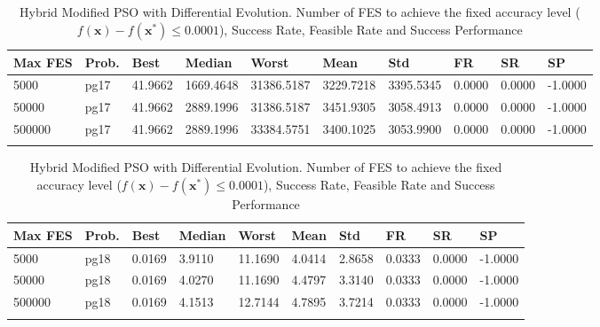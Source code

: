 \documentclass[10pt, a4paper]{book}
\begin{document}
\begin{center}
\begin{longtable}{l l l l l l l l l l}
\textbf{Max FES} & \textbf{Prob.} & \textbf{Best} & \textbf{Median} & \textbf{Worst} & \textbf{Mean} & \textbf{Std} & \textbf{FR} & \textbf{SR} & \textbf{SP} \\
\hline
5000 & pg17 & 41.9662 & 1669.4648 & 31386.5187 & 3229.7218 & 3395.5345 & 0.0000 & 0.0000 & -1.0000 \\
50000 & pg17 & 41.9662 & 2889.1996 & 31386.5187 & 3451.9305 & 3058.4913 & 0.0000 & 0.0000 & -1.0000 \\
500000 & pg17 & 41.9662 & 2889.1996 & 33384.5751 & 3400.1025 & 3053.9900 & 0.0000 & 0.0000 & -1.0000 \\

\caption{ Hybrid Modified PSO with Differential Evolution. Number of FES to achieve the fixed accuracy level ($f(\mathbf{x}) - f(\mathbf{x}^{*}) \leq 0.0001$), Success Rate, Feasible Rate and Success Performance }
\end{longtable}
\end{center}

\begin{center}
\begin{longtable}{l l l l l l l l l l}
\textbf{Max FES} & \textbf{Prob.} & \textbf{Best} & \textbf{Median} & \textbf{Worst} & \textbf{Mean} & \textbf{Std} & \textbf{FR} & \textbf{SR} & \textbf{SP} \\
\hline
5000 & pg18 & 0.0169 & 3.9110 & 11.1690 & 4.0414 & 2.8658 & 0.0333 & 0.0000 & -1.0000 \\
50000 & pg18 & 0.0169 & 4.0270 & 11.1690 & 4.4797 & 3.3140 & 0.0333 & 0.0000 & -1.0000 \\
500000 & pg18 & 0.0169 & 4.1513 & 12.7144 & 4.7895 & 3.7214 & 0.0333 & 0.0000 & -1.0000 \\

\caption{ Hybrid Modified PSO with Differential Evolution. Number of FES to achieve the fixed accuracy level ($f(\mathbf{x}) - f(\mathbf{x}^{*}) \leq 0.0001$), Success Rate, Feasible Rate and Success Performance }
\end{longtable}
\end{center}
\end{document}
